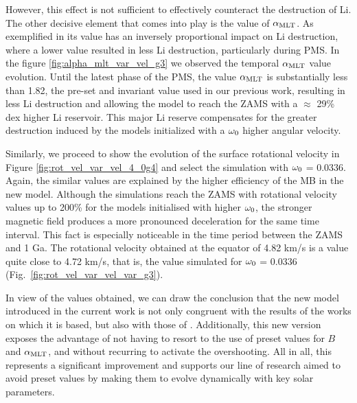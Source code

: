 \documentclass[fleqn,usenatbib]{mnras}
\begin{document}
However, this effect is not sufficient to effectively counteract the destruction of Li. The other decisive element that comes into play is the value of $\alpha_{\mathrm{MLT}}$. As exemplified in \citet{Caballero2020} its value has an inversely proportional impact on Li destruction, where a lower value resulted in less Li destruction, particularly during PMS. In the figure \ref{fig:alpha_mlt_var_vel_g3} we observed the temporal $\alpha_{\mathrm{MLT}}$ value evolution. Until the latest phase of the PMS, the value $\alpha_{\mathrm{MLT}}$ is substantially less than 1.82, the pre-set and invariant value used in our previous work, resulting in less Li destruction and allowing the model to reach the ZAMS with a $\approx$ 29\% dex higher Li reservoir. This major Li reserve compensates for the greater destruction induced by the models initialized with a $\omega_{\mathrm{0}}$ higher angular velocity.\par

Similarly, we proceed to show the evolution of the surface rotational velocity in Figure \ref{fig:rot_vel_var_vel_4_0g4} and select the simulation with $\omega_{\mathrm{0}}$ = 0.0336. Again, the similar values are explained by the higher efficiency of the MB in the new model. Although the simulations reach the ZAMS with rotational velocity values up to 200\% for the models initialised with higher $\omega_{\mathrm{0}}$, the stronger magnetic field produces a more pronounced deceleration for the same time interval. This fact is especially noticeable in the time period between the ZAMS and 1 Ga. The rotational velocity obtained at the equator of 4.82 km/s is a value quite close to 4.72 km/s, that is, the value simulated for $\omega_{\mathrm{0}}$ = 0.0336 (Fig.~\ref{fig:rot_vel_var_vel_var_g3}).\par

In view of the values obtained, we can draw the conclusion that the new model introduced in the current work is not only congruent with the results of the works on which it is based, but also with those of \citet{Caballero2020}. Additionally, this new version exposes the advantage of not having to resort to the use of preset values for $B$ and $\alpha_{\mathrm{MLT}}$, and without recurring to activate the overshooting. All in all, this represents a significant improvement and supports our line of research aimed to avoid preset values by making them to evolve dynamically with key solar parameters.\par
\end{document}
